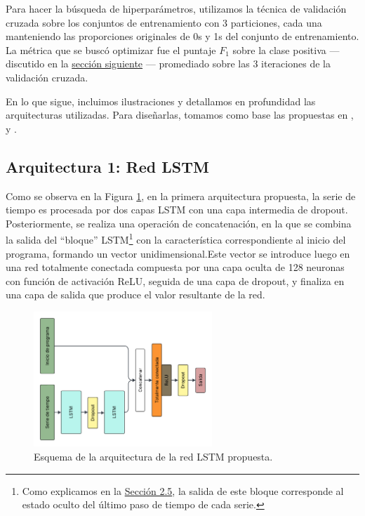 \documentclass[../../main.tex]{subfiles}
\begin{document}
Para hacer la búsqueda de hiperparámetros, utilizamos la técnica de validación cruzada
sobre los conjuntos de entrenamiento con 3 particiones, cada una manteniendo las
proporciones originales de 0s y 1s del conjunto de entrenamiento. La métrica que se buscó
optimizar fue el puntaje \(F_1\) sobre la clase positiva — discutido en la
\hyperref[sec:metricas]{sección siguiente}  — promediado sobre las 3 iteraciones de la
validación cruzada.

En lo que sigue, incluimos ilustraciones y detallamos en profundidad las arquitecturas
utilizadas. Para diseñarlas, tomamos como base las propuestas en
\cite{wang2016timeseriesclassificationscratch}, \cite{Karim_2018} y
\cite{timeseriesclass-with-rnn}.

\subsection{Arquitectura 1: Red LSTM}
Como se observa en la Figura \ref{fig:lstm_v2}, en la primera arquitectura propuesta, la
serie de tiempo es procesada por dos capas LSTM con una capa intermedia de dropout.
Posteriormente, se realiza una operación de concatenación, en la que se combina la salida
del ``bloque'' LSTM\footnote{Como explicamos en la \hyperref[sec:recurrentes]{Sección
2.5}, la salida de este bloque corresponde al estado oculto del último paso de tiempo de
cada serie.} con la característica correspondiente al inicio del programa, formando un
vector unidimensional.Este vector se introduce luego en una red totalmente conectada
compuesta por una capa oculta de 128 neuronas con función de activación ReLU, seguida de
una capa de dropout, y finaliza en una capa de salida que produce el valor resultante de
la red.
\begin{figure}[ht]
    \centering
    \includegraphics[width=0.6\textwidth]{figs/lstm_v2.png}
    \caption{Esquema de la arquitectura de la red LSTM propuesta.}
    \label{fig:lstm_v2}
\end{figure}
\end{document}
